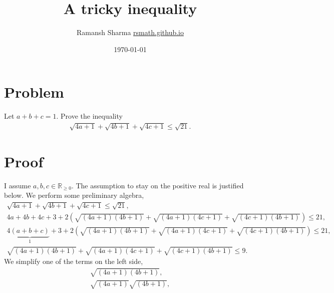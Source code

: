 \documentclass{article}
\title{A tricky inequality}
\author{Ramansh Sharma \url{rsmath.github.io}}
\date{\today}
\begin{document}
\maketitle

\section{Problem}
Let $a+b+c = 1$. Prove the inequality
\begin{align}
\sqrt{4a + 1} + \sqrt{4b + 1} + \sqrt{4c + 1} \le \sqrt{21}.
\end{align}
%
\section{Proof}
I assume $a, b, c \in \mathbb{R}_{\ge 0}$. The assumption to stay on the positive real is justified below. We perform some preliminary algebra,
\begin{align}
\sqrt{4a + 1} + \sqrt{4b + 1} + \sqrt{4c + 1} \le \sqrt{21}, \\ \nonumber
4a + 4b + 4c + 3 + 2 (\sqrt{(4a+1)(4b+1)} + \sqrt{(4a+1)(4c+1)} + \sqrt{(4c+1)(4b+1)}) \le 21, \\ \nonumber
4 \underbrace{(a + b + c)}_{1} + 3 + 2 (\sqrt{(4a+1)(4b+1)} + \sqrt{(4a+1)(4c+1)} + \sqrt{(4c+1)(4b+1)}) \le 21, \\ \nonumber
\sqrt{(4a+1)(4b+1)} + \sqrt{(4a+1)(4c+1)} + \sqrt{(4c+1)(4b+1)} \le 9.
\end{align}
We simplify one of the terms on the left side,
\begin{align}
\sqrt{(4a+1)(4b+1)}, \\ \nonumber
\sqrt{(4a+1)}\sqrt{(4b+1)}, \\ \nonumber
\end{align}
%
\end{document}
